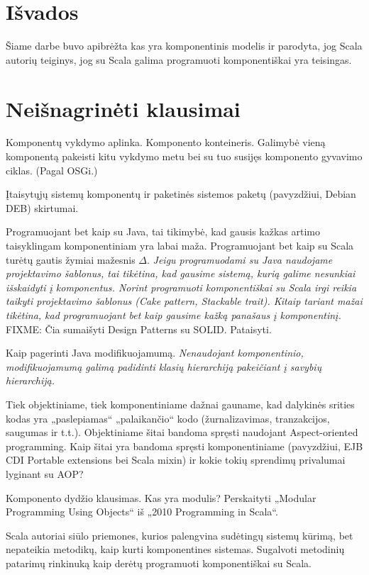 \chapter{Išvados}

Šiame darbe buvo apibrėžta kas yra komponentinis modelis ir parodyta,
jog Scala autorių teiginys, jog su Scala galima programuoti
komponentiškai yra teisingas.

\chapter{Neišnagrinėti klausimai}

Komponentų vykdymo aplinka. Komponento konteineris. Galimybė vieną
komponentą pakeisti kitu vykdymo metu bei su tuo susijęs komponento
gyvavimo ciklas. (Pagal OSGi.)

Įtaisytųjų  sistemų komponentų ir paketinės sistemos
paketų (pavyzdžiui, Debian DEB) skirtumai.

Programuojant bet kaip su Java, tai tikimybė, kad gausis kažkas artimo
taisyklingam komponentiniam yra labai maža. Programuojant bet kaip su
Scala turėtų gautis žymiai mažesnis $\Delta$. \emph{Jeigu programuodami
su Java naudojame projektavimo šablonus, tai tikėtina, kad gausime
sistemą, kurią galime nesunkiai išskaidyti į komponentus. Norint
programuoti komponentiškai su Scala irgi reikia taikyti projektavimo
šablonus (Cake pattern, Stackable trait). Kitaip tariant mažai tikėtina,
kad programuojant bet kaip gausime kažką panašaus į komponentinį.}
FIXME: Čia sumaišyti Design Patterns su SOLID. Pataisyti.

Kaip pagerinti Java modifikuojamumą. \emph{Nenaudojant komponentinio,
modifikuojamumą galimą padidinti klasių hierarchiją pakeičiant
į savybių hierarchiją.}

Tiek objektiniame, tiek komponentiniame dažnai gauname, kad dalykinės
srities kodas yra „paslepiamas“ „palaikančio“ kodo (žurnalizavimas,
tranzakcijos, saugumas ir t.t.). Objektiniame šitai bandoma spręsti
naudojant Aspect-oriented programming. Kaip šitai yra bandoma
spręsti komponentiniame (pavyzdžiui, EJB CDI Portable extensions
bei Scala mixin) ir kokie tokių sprendimų privalumai lyginant su AOP?

Komponento dydžio klausimas. Kas yra modulis? Perskaityti „Modular
Programming Using Objects“ iš „2010 Programming in Scala“.

Scala autoriai siūlo priemones, kurios palengvina sudėtingų sistemų
kūrimą, bet nepateikia metodikų, kaip kurti komponentines sistemas.
Sugalvoti metodinių patarimų rinkinuką kaip derėtų programuoti
komponentiškai su Scala.
